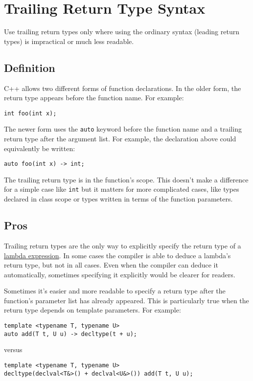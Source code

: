
\section{Trailing Return Type Syntax}\label{sec:trailing-return-type-syntax}
Use trailing return types only where using the ordinary syntax (leading return types) is impractical or much less readable.

\subsection{Definition}
C++ allows two different forms of function declarations. In the older form, the return type appears before the function name. For example:
\begin{verbatim}
int foo(int x);
\end{verbatim}

The newer form uses the \texttt{auto} keyword before the function name and a trailing return type after the argument list. For example, the declaration above could equivalently be written:
\begin{verbatim}
auto foo(int x) -> int;
\end{verbatim}

The trailing return type is in the function's scope. This doesn't make a difference for a simple case like \texttt{int} but it matters for more complicated cases, like types declared in class scope or types written in terms of the function parameters.

\subsection{Pros}
Trailing return types are the only way to explicitly specify the return type of a \hyperref[ch07:sec:lambda-expressions]{lambda expression}. In some cases the compiler is able to deduce a lambda's return type, but not in all cases. Even when the compiler can deduce it automatically, sometimes specifying it explicitly would be clearer for readers.

Sometimes it's easier and more readable to specify a return type after the function's parameter list has already appeared. This is particularly true when the return type depends on template parameters. For example:
\begin{verbatim}
template <typename T, typename U>
auto add(T t, U u) -> decltype(t + u);
\end{verbatim}
versus
\begin{verbatim}
template <typename T, typename U>
decltype(declval<T&>() + declval<U&>()) add(T t, U u);
\end{verbatim}

